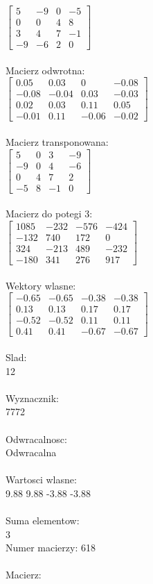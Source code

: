 \documentclass[a4paper,12pt]{article}
\begin{document}
$\begin{bmatrix} 5&-9&0&-5\\0&0&4&8\\3&4&7&-1\\-9&-6&2&0 \end{bmatrix}$
\\
\\
Macierz odwrotna:\\

$\begin{bmatrix} 0.05&0.03&0&-0.08\\-0.08&-0.04&0.03&-0.03\\0.02&0.03&0.11&0.05\\-0.01&0.11&-0.06&-0.02 \end{bmatrix}$
\\
\\
Macierz transponowana:\\

$\begin{bmatrix} 5&0&3&-9\\-9&0&4&-6\\0&4&7&2\\-5&8&-1&0 \end{bmatrix}$
\\
\\
Macierz do potegi 3:\\

$\begin{bmatrix} 1085&-232&-576&-424\\-132&740&172&0\\324&-213&489&-232\\-180&341&276&917 \end{bmatrix}$
\\
\\
Wektory wlasne:\\

$\begin{bmatrix} -0.65&-0.65&-0.38&-0.38\\0.13&0.13&0.17&0.17\\-0.52&-0.52&0.11&0.11\\0.41&0.41&-0.67&-0.67 \end{bmatrix}$
\\
\\
Slad:\\
12
\\
\\
Wyznacznik:\\
7772
\\
\\
Odwracalnosc:\\
Odwracalna
\\
\\
Wartosci wlasne:\\
9.88 9.88 -3.88 -3.88
\\
\\
Suma elementow:\\
3
\\
\newpage
Numer macierzy:
618
\\
\\
Macierz:\\
\end{document}
